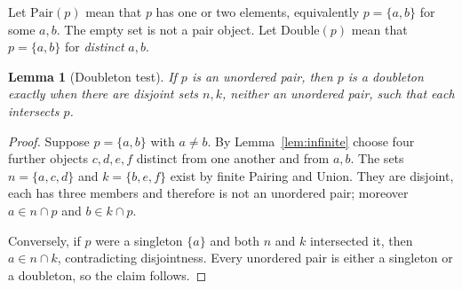 \documentclass[11pt,a4paper]{article}
\numberwithin{equation}{section}
\newtheorem{lemma}[theorem]{Lemma}
\newcommand{\up}[2]{\{#1,#2\}}
\begin{document}
Let $\mathrm{Pair}(p)$ mean that $p$ has one or two elements, equivalently $p=\up ab$ for some $a,b$.  The empty set is not a pair object.  Let $\mathrm{Double}(p)$ mean that $p=\up ab$ for \emph{distinct} $a,b$.

\begin{lemma}[Doubleton test]\label{lem:doubleton}
If $p$ is an unordered pair, then $p$ is a doubleton exactly when there are disjoint sets $n,k$, neither an unordered pair, such that each intersects $p$.
\end{lemma}
\begin{proof}
Suppose $p=\up ab$ with $a\ne b$.  By Lemma~\ref{lem:infinite} choose four further objects $c,d,e,f$ distinct from one another and from $a,b$.  The sets $n=\{a,c,d\}$ and $k=\{b,e,f\}$ exist by finite Pairing and Union.  They are disjoint, each has three members and therefore is not an unordered pair; moreover $a\in n\cap p$ and $b\in k\cap p$.

Conversely, if $p$ were a singleton $\{a\}$ and both $n$ and $k$ intersected it, then $a\in n\cap k$, contradicting disjointness.  Every unordered pair is either a singleton or a doubleton, so the claim follows.
\end{proof}
\end{document}
